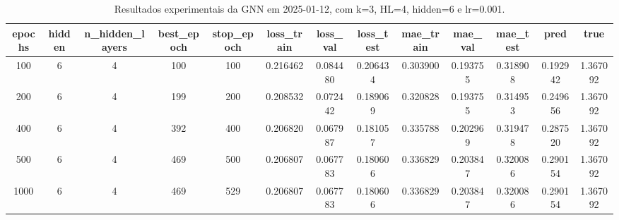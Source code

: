 \begin{table}[h]
\centering
\caption{Resultados experimentais da GNN em 2025-01-12, com k=3, HL=4, hidden=6 e lr=0.001.}
\label{tab:gnn_results_k3_hl4_h6_d20250112}
\begin{tabular}{ccccccccccccc}
\toprule
epochs & hidden & n\_hidden\_layers & best\_epoch & stop\_epoch & loss\_train & loss\_val & loss\_test & mae\_train & mae\_val & mae\_test & pred & true \\
\midrule
100 & 6 & 4 & 100 & 100 & 0.216462 & 0.084480 & 0.206434 & 0.303900 & 0.193755 & 0.318908 & 0.192942 & 1.367092 \\
200 & 6 & 4 & 199 & 200 & 0.208532 & 0.072442 & 0.189069 & 0.320828 & 0.193755 & 0.314953 & 0.249656 & 1.367092 \\
400 & 6 & 4 & 392 & 400 & 0.206820 & 0.067987 & 0.181057 & 0.335788 & 0.202969 & 0.319478 & 0.287520 & 1.367092 \\
500 & 6 & 4 & 469 & 500 & 0.206807 & 0.067783 & 0.180606 & 0.336829 & 0.203847 & 0.320086 & 0.290154 & 1.367092 \\
1000 & 6 & 4 & 469 & 529 & 0.206807 & 0.067783 & 0.180606 & 0.336829 & 0.203847 & 0.320086 & 0.290154 & 1.367092 \\
\bottomrule
\end{tabular}
\end{table}
